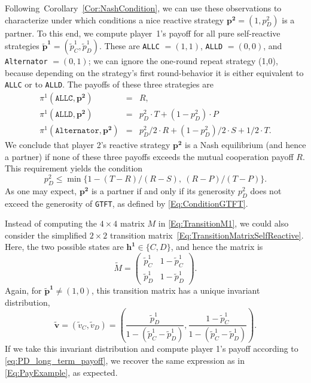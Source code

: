 \documentclass[9pt,twoside,lineno]{pnas-new}
\theoremstyle{plainCl1}
\theoremstyle{plainCl2}
\def\gtft{\texttt{GTFT}}
\def\allc{\texttt{ALLC}}
\def\alld{\texttt{ALLD}}
\def\alt{\texttt{Alternator}}
\begin{document}
Following~Corollary~\ref{Cor:NashCondition}, we can use these observations to characterize under which conditions a nice reactive strategy $\mathbf{p^2}\!=\!(1,p^2_D)$ is a partner. 
To this end, we compute player~1's payoff for all pure self-reactive strategies $\mathbf{\tilde p^1}\!=\!(\tilde p^1_C, \tilde p^1_D)$. 
These are \allc{} $=\! (1,1)$, \alld{} $=\!(0,0)$, and \alt{} $=\!(0,1)$; we can ignore the one-round repeat strategy (1,0), because depending on the strategy's first round-behavior it is either equivalent to \allc{} or to \alld{}. The payoffs of these three strategies are
\begin{equation}
\begin{array}{rcl}
\pi^1(\allc,\mathbf{p^2}) &= &R,\\[0.2cm]
\pi^1(\alld,\mathbf{p^2}) &= &p^2_D \!\cdot \!T +(1\!-\!p^2_D) \!\cdot\!P\\[0.2cm]
\pi^1(\alt,\mathbf{p^2})	&=	& p^2_D/2\!\cdot\!R + (1\!-\!p^2_D)/2\!\cdot\!S + 1/2\!\cdot\! T.
\end{array}
\end{equation}
We conclude that player 2's reactive strategy $\mathbf{p^2}$ is a Nash equilibrium (and hence a partner) if none of these three payoffs exceeds the mutual cooperation payoff $R$. This requirement yields the condition
\begin{equation}
p^2_D \le \min\big\{1\!-\!(T\!-\!R)/(R\!-\!S),~(R\!-\!P)/(T\!-\!P)\big\}.
\end{equation}
As one may expect, $\mathbf{p^2}$ is a partner if and only if its generosity $p^2_D$ does not exceed the generosity of \gtft, as defined by \eqref{Eq:ConditionGTFT}. 

Instead of computing the $4\times4$ matrix $M$ in \eqref{Eq:TransitionM1}, we could also consider the simplified $2\!\times\!2$ transition matrix~\eqref{Eq:TransitionMatrixSelfReactive}. Here, the two possible states are $\mathbf{h^1}\!\in\!\{C,D\}$, and hence the matrix is
\begin{equation}
\tilde{M} = \left(
\begin{array}{cc}
\tilde{p}^1_C	&1\!-\!\tilde p^1_C\\
\tilde p^1_D	&1\!-\!\tilde p^1_D
\end{array}
\right). 
\end{equation}
Again, for $\mathbf{\tilde p^1} \!\neq\! (1,0)$, this transition matrix has a unique invariant distribution,
\begin{equation}
\mathbf{\tilde v} = (\tilde v_C, \tilde v_D) = \left( \frac{\tilde p^1_D}{1-({\tilde p^1_C} - {\tilde p^1_D})}, \frac{1\!-\!\tilde p^1_C}{1-({\tilde p^1_C} - {\tilde p^1_D})} \right).
\end{equation}
If we take this invariant distribution and compute player 1's payoff according to \eqref{eq:PD_long_term_payoff}, we recover the same expression as in \eqref{Eq:PayExample}, as expected.
\end{document}
